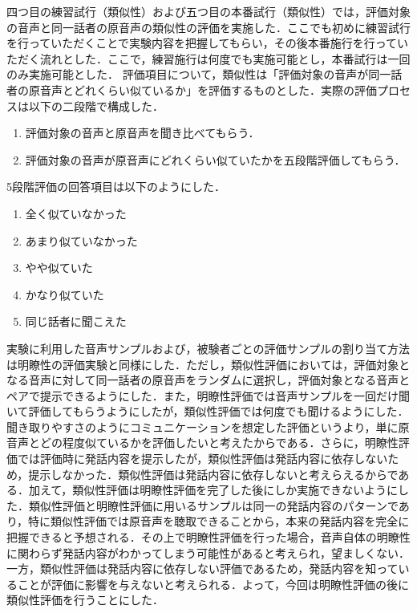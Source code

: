 \documentclass[12pt]{jarticle}
\numberwithin{equation}{section}    %
\numberwithin{figure}{section}      %
\numberwithin{table}{section}      %
\begin{document}
四つ目の練習試行（類似性）および五つ目の本番試行（類似性）では，評価対象の音声と同一話者の原音声の類似性の評価を実施した．ここでも初めに練習試行を行っていただくことで実験内容を把握してもらい，その後本番施行を行っていただく流れとした．ここで，練習施行は何度でも実施可能とし，本番試行は一回のみ実施可能とした．
評価項目について，類似性は「評価対象の音声が同一話者の原音声とどれくらい似ているか」を評価するものとした．実際の評価プロセスは以下の二段階で構成した．
\begin{enumerate}
    \item 評価対象の音声と原音声を聞き比べてもらう．
    \item 評価対象の音声が原音声にどれくらい似ていたかを五段階評価してもらう．
\end{enumerate}
5段階評価の回答項目は以下のようにした．
\begin{enumerate}
    \item 全く似ていなかった
    \item あまり似ていなかった
    \item やや似ていた
    \item かなり似ていた
    \item 同じ話者に聞こえた
\end{enumerate}
実験に利用した音声サンプルおよび，被験者ごとの評価サンプルの割り当て方法は明瞭性の評価実験と同様にした．ただし，類似性評価においては，評価対象となる音声に対して同一話者の原音声をランダムに選択し，評価対象となる音声とペアで提示できるようにした．また，明瞭性評価では音声サンプルを一回だけ聞いて評価してもらうようにしたが，類似性評価では何度でも聞けるようにした．聞き取りやすさのようにコミュニケーションを想定した評価というより，単に原音声とどの程度似ているかを評価したいと考えたからである．さらに，明瞭性評価では評価時に発話内容を提示したが，類似性評価は発話内容に依存しないため，提示しなかった．類似性評価は発話内容に依存しないと考えらえるからである．加えて，類似性評価は明瞭性評価を完了した後にしか実施できないようにした．類似性評価と明瞭性評価に用いるサンプルは同一の発話内容のパターンであり，特に類似性評価では原音声を聴取できることから，本来の発話内容を完全に把握できると予想される．その上で明瞭性評価を行った場合，音声自体の明瞭性に関わらず発話内容がわかってしまう可能性があると考えられ，望ましくない．一方，類似性評価は発話内容に依存しない評価であるため，発話内容を知っていることが評価に影響を与えないと考えられる．よって，今回は明瞭性評価の後に類似性評価を行うことにした．
\end{document}
